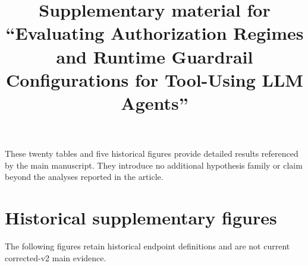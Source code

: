 \documentclass[preprint,12pt,a4paper]{elsarticle}
\newcommand{\ProjectRoot}{.}
\begin{document}
\begin{frontmatter}
\title{Supplementary material for ``Evaluating Authorization Regimes and Runtime Guardrail Configurations for Tool-Using LLM Agents''}
\end{frontmatter}

These twenty tables and five historical figures provide detailed results referenced by the main manuscript.
They introduce no additional hypothesis family or claim beyond the analyses
reported in the article.





















\clearpage
\section*{Historical supplementary figures}
The following figures retain historical endpoint definitions and are not current corrected-v2 main evidence.





\end{document}
